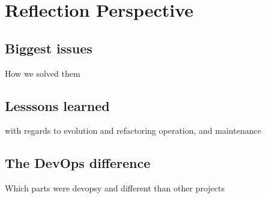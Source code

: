 \section{Reflection Perspective}

\subsection{Biggest issues}

How we solved them

\subsection{Lesssons learned}

with regards to
evolution and refactoring
operation, and
maintenance

\subsection{The DevOps difference}

Which parts were devopsy and different than other projects
